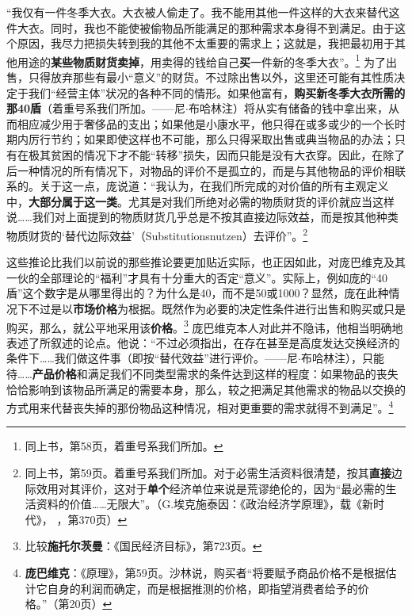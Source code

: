 \documentclass[fontset=fandol, a4paper, 12pt, openright]{ctexbook}
\newcommand{\RN}[1]{%
  \textup{\uppercase\expandafter{\romannumeral#1}}%
}
\begin{document}
“我仅有一件冬季大衣。大衣被人偷走了。我不能用其他一件这样的大衣来替代这件大衣。同时，我也不能使被偷物品所能满足的那种需求本身得不到满足。由于这个原因，我尽力把损失转到我的其他不太重要的需求上；这就是，我把最初用于其他用途的\textbf{某些物质财货卖掉}，用卖得的钱给自己\textbf{买}一件新的冬季大衣”。\footnote{同上书，第58页，着重号系我们所加。} 为了出售，只得放弃那些有最小“意义”的财货。不过除出售以外，这里还可能有其性质决定于我们“经营主体”状况的各种不同的情形。如果他富有，\textbf{购买新冬季大衣所需的那40盾}（着重号系我们所加。——尼$\cdot$布哈林注）将从实有储备的钱中拿出来，从而相应减少用于奢侈品的支出；如果他是小康水平，他只得在或多或少的一个长时期内厉行节约；如果即使这样也不可能，那么只得采取出售或典当物品的办法；只有在极其贫困的情况下才不能“转移”损失，因而只能是没有大衣穿。因此，在除了后一种情况的所有情况下，对物品的评价不是孤立的，而是与其他物品的评价相联系的。关于这一点，庞说道：“我认为，在我们所完成的对价值的所有主观定义中，\textbf{大部分属于这一类}。尤其是对我们所绝对必需的物质财货的评价就应当这样说……我们对上面提到的物质财货几乎总是不按其直接边际效益，而是按其他种类物质财货的‘替代边际效益’（Substitutionsnutzen）去评价”。\footnote{同上书，第59页。着重号系我们所加。对于必需生活资料很清楚，按其\textbf{直接}边际效用对其评价，这对于\textbf{单个}经济单位来说是荒谬绝伦的，因为“最必需的生活资料的价值……无限大”。（G.埃克施泰因：《政治经济学原理》，载《新时代》，\RN{28}，第370页）}

这些推论比我们以前说的那些推论要更加贴近实际，也正因如此，对庞巴维克及其一伙的全部理论的“福利”才具有十分重大的否定“意义”。实际上，例如庞的“40盾”这个数字是从哪里得出的？为什么是40，而不是50或1000？显然，庞在此种情况下不过是以\textbf{市场价格}为根据。既然作为必要的决定性条件进行出售和购买或只是购买，那么，就公平地采用该\textbf{价格}。\footnote{比较\textbf{施托尔茨曼}：《国民经济目标》，第723页。} 庞巴维克本人对此并不隐讳，他相当明确地表述了所叙述的论点。他说：“不过必须指出，在存在甚至是高度发达交换经济的条件下……我们做这件事（即按“替代效益”进行评价。——尼$\cdot$布哈林注），只能待……\textbf{产品价格}和满足我们不同类型需求的条件达到这样的程度：如果物品的丧失恰恰影响到该物品所满足的需要本身，那么，较之把满足其他需求的物品以交换的方式用来代替丧失掉的那份物品这种情况，相对更重要的需求就得不到满足”。\footnote{\textbf{庞巴维克}：《原理》，第59页。沙林说，购买者“将要赋予商品价格不是根据估计它自身的利润而确定，而是根据推测的价格，即指望消费者给予的价格。”（第20页）}
\end{document}
